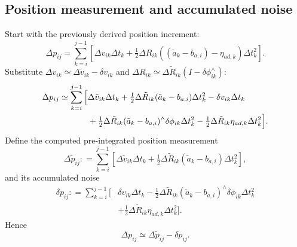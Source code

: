 \documentclass[11pt,a4paper]{article}
\newcommand{\defeq}{\mathrel{\mathop:}=}
\begin{document}
\subsection{Position measurement and accumulated noise}
Start with the previously derived position increment:
\begin{equation}
\Delta p_{ij}=
\sum_{k=i}^{j-1}
\left[
\Delta v_{ik}\Delta t_k+
\tfrac12\Delta R_{ik}((\tilde a_k-b_{a,i})-\eta_{ad,k})\Delta t_k^2
\right].
\end{equation}
Substitute $\Delta v_{ik}\simeq\Delta\tilde v_{ik}-\delta v_{ik}$
and $\Delta R_{ik}\simeq\Delta\tilde R_{ik}(I-\delta\phi_{ik}^\wedge)$:
\begin{align}
\Delta p_{ij}\simeq\sum_{k=i}^{j-1}\Big[
&\Delta\tilde v_{ik}\Delta t_k
+\tfrac12\Delta\tilde R_{ik}(\tilde a_k-b_{a,i})\Delta t_k^2
-\delta v_{ik}\Delta t_k\notag\\
&+\tfrac12\Delta\tilde R_{ik}(\tilde a_k-b_{a,i})^\wedge
\delta\phi_{ik}\Delta t_k^2
-\tfrac12\Delta\tilde R_{ik}\eta_{ad,k}\Delta t_k^2
\Big].
\end{align}
Define the computed pre-integrated position measurement
\begin{equation}\label{eq:tildep}
\boxed{\Delta\tilde p_{ij}\defeq
\sum_{k=i}^{j-1}\left[
\Delta\tilde v_{ik}\Delta t_k+
\tfrac12\Delta\tilde R_{ik}(\tilde a_k-b_{a,i})\Delta t_k^2
\right],}
\end{equation}
and its accumulated noise
\begin{equation}\label{eq:dpnoise}
\boxed{\begin{aligned}
\delta p_{ij}\defeq\sum_{k=i}^{j-1}\Big[
&\delta v_{ik}\Delta t_k
-\tfrac12\Delta\tilde R_{ik}(\tilde a_k-b_{a,i})^\wedge
\delta\phi_{ik}\Delta t_k^2\\
&+\tfrac12\Delta\tilde R_{ik}\eta_{ad,k}\Delta t_k^2
\Big].
\end{aligned}}
\end{equation}
Hence
\begin{equation}\label{eq:posNoise}
\boxed{\Delta p_{ij}\simeq\Delta\tilde p_{ij}-\delta p_{ij}.}
\end{equation}
\end{document}
